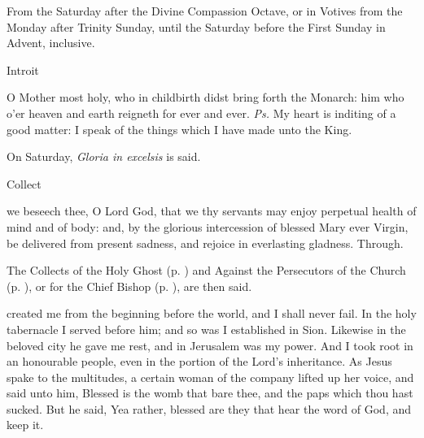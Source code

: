 \begin{rubric}
    {From the Saturday after the Divine Compassion Octave, or in Votives from the Monday after Trinity Sunday, until the Saturday before the First Sunday in Advent, inclusive.}
\end{rubric}
\begin{inhead}
    Introit
\end{inhead}
 O Mother most holy, who in childbirth didst bring forth the Monarch: him who o'er heaven and earth reigneth for ever and ever. \textit{Ps.} My heart is inditing of a good matter: I speak of the things which I have made unto the King.
\begin{rubric}
    On Saturday, \emph{Gloria in excelsis} is said.
\end{rubric}
\begin{inhead}
    Collect
\end{inhead}
 we beseech thee, O Lord God, that we thy servants may enjoy perpetual health of mind and of body: and, by the glorious intercession of blessed Mary ever Virgin, be delivered from present sadness, and rejoice in everlasting gladness. Through.
\begin{rubric}
    The Collects of the Holy Ghost (p. \pageref{SPHolyGhost}) and Against the Persecutors of the Church (p. \pageref{SPAgainst}), or for the Chief Bishop (p. \pageref{SPChiefBishop}), are then said.
\end{rubric}
 created me from the beginning before the world, and I shall never fail. In the holy tabernacle I served before him; and so was I established in Sion. Likewise in the beloved city he gave me rest, and in Jerusalem was my power. And I took root in an honourable people, even in the portion of the Lord's inheritance.
 As Jesus spake to the multitudes, a certain woman of the company lifted up her voice, and said unto him, Blessed is the womb that bare thee, and the paps which thou hast sucked. But he said, Yea rather, blessed are they that hear the word of God, and keep it.
